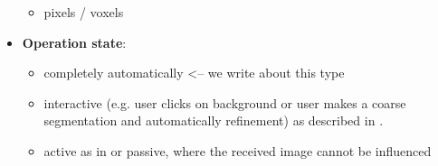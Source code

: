 \begin{itemize}
\begin{itemize}
              \item pixels / voxels \cite{wolz2012multi}
          \end{itemize}
    \item \textbf{Operation state}:
          \begin{itemize}
              \item completely automatically <-- we write about this type
              \item interactive (e.g. user clicks on background or user makes a
                    coarse segmentation and automatically refinement) as
                    described in
                    \cite{protiere2007interactive,rother2004grabcut}.
              \item active as in
                    \cite{schiebener2011segmentation,schiebener2012discovery} or
                    passive, where the received image cannot be influenced
          \end{itemize}
\end{itemize}
